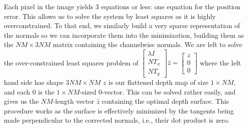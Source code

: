 \documentclass[final]{cvpr}
\begin{document}
	Each pixel in the image yields 3 equations or less: one equation for the position error. This allows us to solve the system by least squares as it is highly overconstrained. To that end, we similarly build a very sparse representation of the normals so we can incorporate them into the minimization, building them as the $NM \times 3NM$ matrix containing the channelwise normals. We are left to solve the over-constrained least squares problem of $\begin{bmatrix}\lambda I\\NT_x\\NT_y\end{bmatrix} \hat{z} = \begin{bmatrix}z\\
	0\\
	0 \end{bmatrix}$ where the left hand side has shape $3NM \times NM$ $z$ is our flattened depth map of size $1 \times NM$, and each $0$ is the $1\times NM$-sized 0-vector. This can be solved rather easily, and gives us the $NM$-length vector $\hat{z}$ containing the optimal depth surface. 
	This procedure works as the surface is effectively minimized by the tangents being made perpendicular to the corrected normals, i.e., their dot product is zero. 
\end{document}
